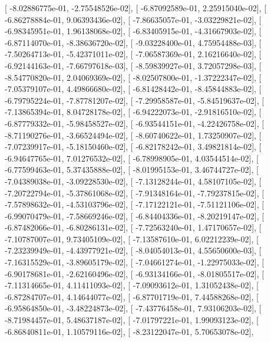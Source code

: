 \documentclass{article}
\begin{document}
       [ -8.02886775e-01,  -2.75548526e-02],
       [ -6.87092589e-01,   2.25915040e-02],
       [ -6.86278884e-01,   9.06393436e-02],
       [ -7.86635057e-01,  -3.03229821e-02],
       [ -6.98345951e-01,   1.96138068e-02],
       [ -6.83405915e-01,  -4.31667903e-02],
       [ -6.87114070e-01,  -8.38636720e-02],
       [ -9.03228400e-01,   4.75954488e-03],
       [ -7.50264713e-01,  -5.42371011e-02],
       [ -7.06587369e-01,   2.16216640e-02],
       [ -6.92144163e-01,  -7.66797618e-03],
       [ -8.59839927e-01,   3.72057298e-03],
       [ -8.54770820e-01,   2.04069369e-02],
       [ -8.02507800e-01,  -1.37222347e-02],
       [ -7.05379107e-01,   4.49866680e-02],
       [ -6.81428442e-01,  -8.45844883e-02],
       [ -6.79795224e-01,  -7.87781207e-02],
       [ -7.29958587e-01,  -5.84519637e-02],
       [ -7.13865394e-01,   8.04728178e-02],
       [ -6.94222073e-01,  -2.91816510e-02],
       [ -6.87779332e-01,  -5.98458527e-02],
       [ -6.93544151e-01,  -4.22426758e-02],
       [ -8.71190276e-01,  -3.66524494e-02],
       [ -8.60740622e-01,   1.73250907e-02],
       [ -7.07239917e-01,  -5.18150460e-02],
       [ -6.82178242e-01,   3.49821814e-02],
       [ -6.94647765e-01,   7.01276532e-02],
       [ -6.78998905e-01,   4.03544514e-02],
       [ -6.77599463e-01,   5.37435888e-02],
       [ -8.01995153e-01,   3.46744727e-02],
       [ -7.04389038e-01,  -3.09228530e-02],
       [ -7.13128244e-01,   4.58107105e-02],
       [ -7.20722794e-01,  -5.37861068e-02],
       [ -7.91348164e-01,  -7.79237815e-02],
       [ -7.57898632e-01,  -4.53103796e-02],
       [ -7.17122121e-01,  -7.51121106e-02],
       [ -6.99070479e-01,  -7.58669246e-02],
       [ -6.84404336e-01,  -8.20219147e-02],
       [ -6.87482066e-01,  -6.80286131e-02],
       [ -7.72563240e-01,   1.47170657e-02],
       [ -7.10787007e-01,   9.73405109e-02],
       [ -7.13587610e-01,   6.02212239e-02],
       [ -7.23239949e-01,  -4.43977921e-02],
       [ -8.04054013e-01,   4.55650600e-03],
       [ -7.16315529e-01,  -3.89605179e-02],
       [ -7.04661274e-01,  -1.22975033e-02],
       [ -6.90178681e-01,  -2.62160496e-02],
       [ -6.93134166e-01,  -8.01805517e-02],
       [ -7.11314665e-01,   4.11411093e-02],
       [ -7.09093612e-01,   1.31052438e-02],
       [ -6.87284707e-01,   4.14644077e-02],
       [ -6.87701719e-01,   7.44588268e-02],
       [ -6.95864850e-01,  -3.48224873e-02],
       [ -7.43776458e-01,   7.93106203e-02],
       [ -8.71984457e-01,   5.48637187e-02],
       [ -7.01797221e-01,   1.99093123e-02],
       [ -6.86840811e-01,   1.10579116e-02],
       [ -8.23122047e-01,   5.70653078e-02],
\end{document}
